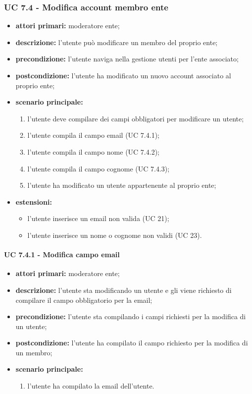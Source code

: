 			\subsubsection{UC 7.4 - Modifica account membro ente}
			\begin{itemize}
				\item \textbf{attori primari:} moderatore ente;
				\item \textbf{descrizione:} l'utente può modificare un membro del proprio ente;
				\item \textbf{precondizione:} l'utente naviga nella gestione utenti per l'ente associato;
				\item \textbf{postcondizione:} l'utente ha modificato un nuovo account associato al proprio ente;
				\item \textbf{scenario principale:}
				\begin{enumerate}
					\item{l'utente deve compilare dei campi obbligatori per modificare un utente;}
					\item{l'utente compila il campo email (UC 7.4.1);}
					\item{l'utente compila il campo nome (UC 7.4.2);}
					\item{l'utente compila il campo cognome (UC 7.4.3);}
					\item{l'utente ha modificato un utente appartenente al proprio ente;}
				\end{enumerate}
				\item \textbf{estensioni:}
				\begin{itemize}
					\item l'utente inserisce un email non valida (UC 21);
					\item l'utente inserisce un nome o cognome non validi (UC 23).
				\end{itemize}
			\end{itemize}

			\paragraph{UC 7.4.1 - Modifica campo email}
			\begin{itemize}
				\item \textbf{attori primari:} moderatore ente;
				\item \textbf{descrizione:} l'utente sta modificando un utente e gli viene richiesto di compilare il campo obbligatorio per la email;
				\item \textbf{precondizione:} l'utente sta compilando i campi richiesti per la modifica di un utente;
				\item \textbf{postcondizione:} l'utente ha compilato il campo richiesto per la modifica di un membro;
				\item \textbf{scenario principale:}
				\begin{enumerate}
					\item{l'utente ha compilato la email dell'utente.}
				\end{enumerate}
			\end{itemize}

